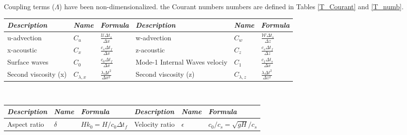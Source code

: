\documentclass[a4paper]{article}
\numberwithin{equation}{section}
\begin{document}
\begin{itemize}[label=\textbullet,font=\tiny]
   
    Coupling terms ($\Lambda$) have been non-dimensionalized. the Courant numbers numbers 
    are defined in Tables \ref{T_Courant} and \ref{T_numb}.\\
    
    {\renewcommand{\arraystretch}{2}
    \begin{tabular}{|l|l|l|l|l|l|}
     \hline
     \textit{Description} & \textit{Name} & \textit{Formula} &
     \textit{Description} & \textit{Name} & \textit{Formula} \\
     \hline
     u-advection   & $C_u$ & $\frac{\mathcal{U}\Delta{t_s}}{\Delta{x}}$ &
     w-advection   & $C_w$ & $\frac{\mathcal{W}\Delta{t_s}}{\Delta{z}}$ \\
     x-acoustic    & $C_x$ & $\frac{c_s\Delta{t_f}}{\Delta{x}}$ &
     z-acoustic    & $C_z$ & $\frac{c_s\Delta{t_f}}{\Delta{z}}$\\
     Surface waves & $C_0$ & $\frac{c_0\Delta t_f}{\Delta x}$ &
     Mode-1 Internal 
     Waves velociy & $C_1$ & $\frac{c_1\Delta{t_s}}{\Delta{x}}$ \\
     Second viscosity (x) & $C_{\lambda,x}$ & $\frac{\lambda \Delta t^2}{\Delta x^2}$ &
     Second viscosity (z) & $C_{\lambda,z}$& $\frac{\lambda \Delta t^2}{\Delta z^2}$ \\
     \hline
    \end{tabular}}\\
    \label{T_Courant}

    {\renewcommand{\arraystretch}{2}
    \begin{tabular}{|l|l|l|l|l|l|}
     \hline
     \textit{Description} & \textit{Name} & \textit{Formula} &
     \textit{Description} & \textit{Name} & \textit{Formula} \\
     \hline
     Aspect ratio         & $\delta$   & $H k_0=H/c_0\Delta t_f$                &
     Velocity ratio       & $\epsilon$ & $c_0/c_s=\sqrt{gH}/c_s$  \\
     \hline
    \end{tabular}} \\
    \label{T_numb}


\end{itemize}
\end{document}
